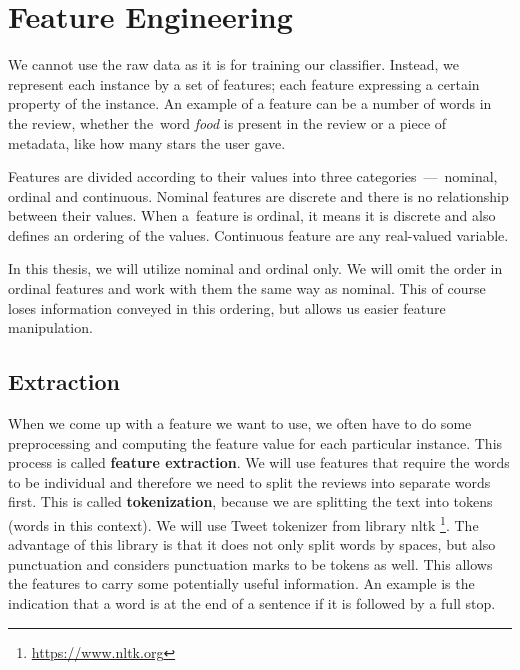 \chapter{Feature Engineering}
\label{chap:fea}



We cannot use the raw data as it is for training our classifier.
Instead, we represent each instance by a set of features;
each feature expressing a certain property of the instance.
An example of a feature can be a number of words in the review,
whether the~word {\it food} is present in the review
or a piece of metadata, like how many stars the user gave.

Features are divided according to their values into three categories~---~nominal, ordinal and continuous.
Nominal features are discrete and there is no relationship between their values.
When a~feature is ordinal, it means it is discrete and also defines an ordering of the values.
Continuous feature are any real-valued variable.

In this thesis, we will utilize nominal and ordinal only.
We will omit the order in ordinal features and work with them the same way as nominal.
This of course loses information conveyed in this ordering,
but allows us easier feature manipulation.


\section{Extraction}

When we come up with a feature we want to use,
we often have to do some preprocessing and computing the feature value for each particular instance.
This process is called {\bf feature extraction}.
We will use features that require the words to be individual
and therefore we need to split the reviews into separate words first.
This is called {\bf tokenization}, because we are splitting the text into tokens (words in this context).
We will use Tweet tokenizer from library nltk \footnote{\url{https://www.nltk.org}}.
The advantage of this library is that it does not only split words by spaces,
but also punctuation and considers punctuation marks to be tokens as well.
This allows the features to carry some potentially useful information.
An example is the indication that a word is at the end of a sentence if it is followed by a full stop.

